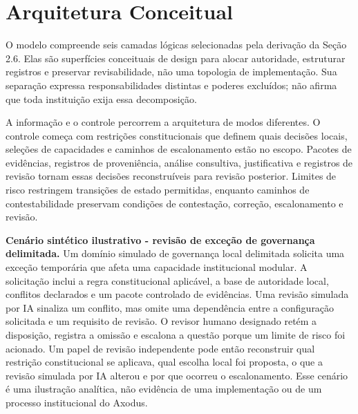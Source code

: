 \documentclass[11pt]{article}
\begin{document}
\section{Arquitetura Conceitual}

O modelo compreende seis camadas lógicas selecionadas pela derivação da Seção
2.6. Elas são superfícies conceituais de design para alocar autoridade,
estruturar registros e preservar revisabilidade, não uma topologia de
implementação. Sua separação expressa responsabilidades distintas e poderes
excluídos; não afirma que toda instituição exija essa decomposição.

A informação e o controle percorrem a arquitetura de modos diferentes. O
controle começa com restrições constitucionais que definem quais decisões
locais, seleções de capacidades e caminhos de escalonamento estão no escopo.
Pacotes de evidências, registros de proveniência, análise consultiva,
justificativa e registros de revisão tornam essas decisões reconstruíveis para
revisão posterior. Limites de risco restringem transições de estado
permitidas, enquanto caminhos de contestabilidade preservam condições de
contestação, correção, escalonamento e revisão.

\noindent\textbf{Cenário sintético ilustrativo - revisão de exceção de
governança delimitada.} Um domínio simulado de governança local delimitada
solicita uma exceção temporária que afeta uma capacidade institucional modular.
A solicitação inclui a regra constitucional aplicável, a base de autoridade
local, conflitos declarados e um pacote controlado de evidências. Uma revisão
simulada por IA sinaliza um conflito, mas omite uma dependência entre a
configuração solicitada e um requisito de revisão. O revisor humano designado
retém a disposição, registra a omissão e escalona a questão porque um limite de
risco foi acionado. Um papel de revisão independente pode então reconstruir
qual restrição constitucional se aplicava, qual escolha local foi proposta, o
que a revisão simulada por IA alterou e por que ocorreu o escalonamento. Esse
cenário é uma ilustração analítica, não evidência de uma implementação ou de um
processo institucional do Axodus.
\end{document}
